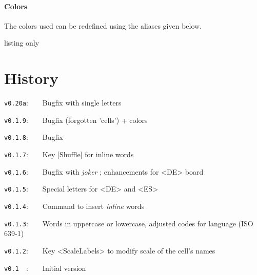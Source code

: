 \documentclass{article}
\begin{document}
\begin{PresentationCode}{}
{\Huge {}}

{\Huge {}}
\end{PresentationCode}

\subsection{Colors}

The colors used can be redefined using the aliases given below.

\begin{PresentationCode}{listing only}
\end{PresentationCode}

\newpage

\part*{History}

\verb|v0.20a|:~~~~Bugfix with single letters

\verb|v0.1.9|:~~~~Bugfix (forgotten 'cells') + colors

\verb|v0.1.8|:~~~~Bugfix

\verb|v0.1.7|:~~~~Key \textsf{[Shuffle]} for inline words

\verb|v0.1.6|:~~~~Bugfix with \textit{joker} ; enhancements for \textsf{<DE>} board

\verb|v0.1.5|:~~~~Special letters for \textsf{<DE>} and \textsf{<ES>}

\verb|v0.1.4|:~~~~Command to insert \textit{inline} words

\verb|v0.1.3|:~~~~Words in uppercase or lowercase, adjusted codes for language (ISO 639-1)

\verb|v0.1.2|:~~~~Key \textsf{<ScaleLabels>} to modify scale of the cell's names

\verb|v0.1  |:~~~~Initial version
\end{document}
